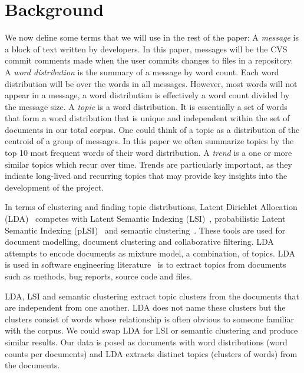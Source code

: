 \documentclass[times, 10pt,twocolumn]{article}
\newcommand{\shrinkit}{\vspace*{-.3em}}
\begin{document}
\shrinkit
\section{Background}
\shrinkit


We now define some terms that we will use in the rest of the paper: A
\emph{message} is a block of text written by developers. In this
paper, messages will be the CVS commit comments made when the user
commits changes to files in a repository. A \emph{word distribution}
is the summary of a message by word count. Each word distribution will
be over the words in all messages. However, most words will not appear
in a message, a word distribution is effectively a word count divided
by the message size. A \emph{topic} is a word distribution. It is
essentially a set of words that form a word distribution that is
unique and independent within the set of documents in our total
corpus. One could think of a topic as a distribution of the centroid
of a group of messages. In this paper we often summarize topics by the
top 10 most frequent words of their word distribution.  A \emph{trend}
is a one or more similar topics which recur over time.  Trends are
particularly important, as they indicate long-lived and recurring
topics that may provide key insights into the development of the
project.


In terms of clustering and finding topic distributions, Latent
Dirichlet Allocation (LDA)~\cite{944937} competes with Latent Semantic
Indexing
(LSI)~\cite{1421013,1374321,10.1109/ICPC.2007.13,10.1109/ICPC.2006.17},
probabilistic Latent Semantic Indexing (pLSI)~\cite{944937} and
semantic clustering~\cite{1698774,1566153}. These tools are used for
document modelling, document clustering and collaborative
filtering. LDA attempts to encode documents as mixture
model, a combination, of topics.  LDA is used in software engineering
literature~\cite{lukins2008,10.1109/MSR.2007.20,NIPS2007637,1321709}
is to extract topics from documents such as methods, bug
reports, source code and files.

LDA, LSI and semantic clustering extract topic
clusters from the documents that are independent from one another. LDA
does not name these clusters but the clusters consist of words whose
relationship is often obvious to someone familiar with the corpus. We
could swap LDA for LSI or semantic clustering and produce similar
results. Our data is posed as documents with word distributions (word
counts per documents) and LDA extracts distinct topics (clusters of
words) from the documents.
\end{document}
